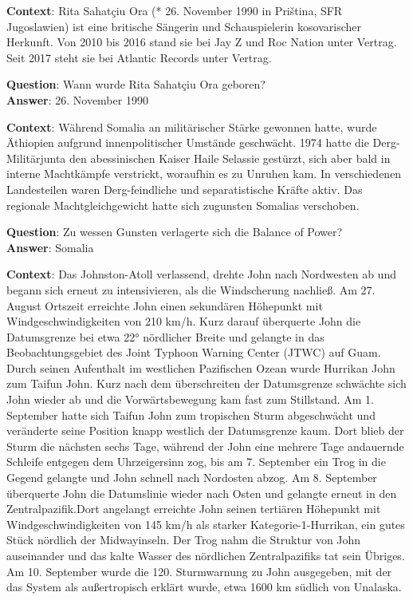 \begin{examples}
  \item \textbf{Context}:
        Rita Sahatçiu Ora (* 26. November 1990 in Priština, SFR Jugoslawien) ist
        eine britische Sängerin und Schauspielerin kosovarischer Herkunft. Von 2010 bis 2016 stand
        sie bei Jay Z und Roc Nation unter Vertrag. Seit 2017 steht sie bei Atlantic Records unter Vertrag.

        \textbf{Question}: Wann wurde Rita Sahatçiu Ora geboren?\\
        \textbf{Answer}: 26. November 1990
  \item \textbf{Context}:
        Während Somalia an militärischer Stärke gewonnen hatte, wurde Äthiopien aufgrund innenpolitischer
        Umstände geschwächt. 1974 hatte die Derg-Militärjunta den abessinischen Kaiser Haile Selassie
        gestürzt, sich aber bald in interne Machtkämpfe verstrickt, woraufhin es zu Unruhen kam. In
        verschiedenen Landesteilen waren Derg-feindliche und separatistische Kräfte aktiv. Das regionale
        Machtgleichgewicht hatte sich zugunsten Somalias verschoben.

      \textbf{Question}: Zu wessen Gunsten verlagerte sich die Balance of Power?\\
      \textbf{Answer}: Somalia
  \item \label{itm:mlqa-strange-answer-span} \textbf{Context}:
        Das Johnston-Atoll verlassend, drehte John nach Nordwesten ab und begann sich erneut zu
        intensivieren, als die Windscherung nachließ. Am 27. August Ortszeit erreichte John einen
        sekundären Höhepunkt mit Windgeschwindigkeiten von 210 km/h. Kurz darauf überquerte John
        die Datumsgrenze bei etwa 22° nördlicher Breite und gelangte in das Beobachtungsgebiet
        des Joint Typhoon Warning Center (JTWC) auf Guam. Durch seinen Aufenthalt im westlichen
        Pazifischen Ozean wurde Hurrikan John zum Taifun John. Kurz nach dem überschreiten
        der Datumsgrenze schwächte sich John wieder ab und die Vorwärtsbewegung kam fast zum
        Stillstand. Am 1. September hatte sich Taifun John zum tropischen Sturm abgeschwächt und
        veränderte seine Position knapp westlich der Datumsgrenze kaum. Dort blieb der Sturm die
        nächsten sechs Tage, während der John eine mehrere Tage andauernde Schleife entgegen dem
        Uhrzeigersinn zog, bis am 7. September ein Trog in die Gegend gelangte und John schnell
        nach Nordosten abzog. Am 8. September überquerte John die Datumslinie wieder nach Osten
        und gelangte erneut in den Zentralpazifik.Dort angelangt erreichte John seinen tertiären
        Höhepunkt mit Windgeschwindigkeiten von 145 km/h als starker Kategorie-1-Hurrikan, ein
        gutes Stück nördlich der Midwayinseln. Der Trog nahm die Struktur von John auseinander
        und das kalte Wasser des nördlichen Zentralpazifiks tat sein Übriges. Am 10. September
        wurde die 120. Sturmwarnung zu John ausgegeben, mit der das System als außertropisch
        erklärt wurde, etwa 1600 km südlich von Unalaska.


\end{examples}
